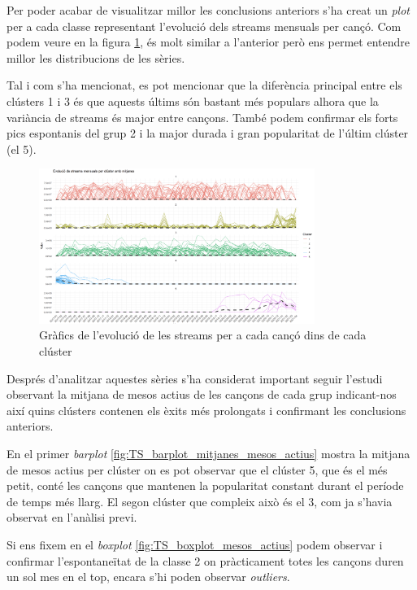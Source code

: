 \documentclass{article}
\begin{document}
Per poder acabar de visualitzar millor les conclusions anteriors s'ha creat un \textit{plot} per a cada classe representant l'evolució dels streams mensuals per cançó. Com podem veure en la figura \ref{fig:ts_clust_streams_month_cluster}, és molt similar a l'anterior però ens permet entendre millor les distribucions de les sèries. 

Tal i com s'ha mencionat, es pot mencionar que la diferència principal entre els clústers 1 i 3 és que aquests últims són bastant més populars alhora que la variància de streams és major entre cançons. També podem confirmar els forts pics espontanis del grup 2 i la major durada i gran popularitat de l'últim clúster (el 5).

\begin{figure}[H]
    \centering
    \includegraphics[width=0.8\textwidth]{Images/4_clustering/time_series/streams_cada_mes_per_cluster_amb_mitjana.png}
    \caption{Gràfics de l'evolució de les streams per a cada cançó dins de cada clúster}
    \label{fig:ts_clust_streams_month_cluster}
\end{figure}

Després d'analitzar aquestes sèries s'ha considerat important seguir l'estudi observant la mitjana de mesos actius de les cançons de cada grup indicant-nos així quins clústers contenen els èxits més prolongats i confirmant les conclusions anteriors.

En el primer \textit{barplot} \ref{fig:TS_barplot_mitjanes_mesos_actius} mostra la mitjana de mesos actius per clúster on es pot observar que el clúster 5, que és el més petit, conté les cançons que mantenen la popularitat constant durant el període de temps més llarg. El segon clúster que compleix això és el 3, com ja s'havia observat en l'anàlisi previ. 

Si ens fixem en el \textit{boxplot} \ref{fig:TS_boxplot_mesos_actius} podem observar i confirmar l'espontaneïtat de la classe 2 on pràcticament totes les cançons duren un sol mes en el top, encara s'hi poden observar \textit{outliers}.
\end{document}
